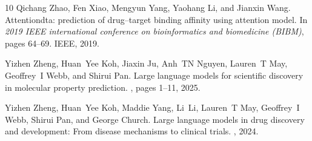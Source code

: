\documentclass[letterpaper,twocolumn,10pt]{llncs}
\begin{document}
\begin{thebibliography}{10}
Qichang Zhao, Fen Xiao, Mengyun Yang, Yaohang Li, and Jianxin Wang.
\newblock Attentiondta: prediction of drug--target binding affinity using attention model.
\newblock In {\em 2019 IEEE international conference on bioinformatics and biomedicine (BIBM)}, pages 64--69. IEEE, 2019.

Yizhen Zheng, Huan~Yee Koh, Jiaxin Ju, Anh~TN Nguyen, Lauren~T May, Geoffrey~I Webb, and Shirui Pan.
\newblock Large language models for scientific discovery in molecular property prediction.
, pages 1--11, 2025.

Yizhen Zheng, Huan~Yee Koh, Maddie Yang, Li~Li, Lauren~T May, Geoffrey~I Webb, Shirui Pan, and George Church.
\newblock Large language models in drug discovery and development: From disease mechanisms to clinical trials.
, 2024.

\end{thebibliography}

\clearpage          
\onecolumn  
\appendix 
\end{document}
